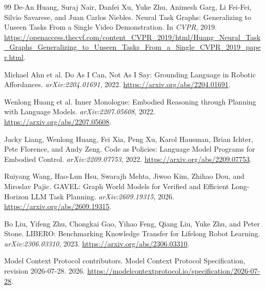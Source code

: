 \documentclass[10pt,twocolumn,letterpaper]{article}
\begin{document}
\begin{thebibliography}{99}
De-An Huang, Suraj Nair, Danfei Xu, Yuke Zhu, Animesh Garg, Li Fei-Fei, Silvio Savarese, and Juan Carlos Niebles.
Neural Task Graphs: Generalizing to Unseen Tasks From a Single Video Demonstration.
In \emph{CVPR}, 2019.
\url{https://openaccess.thecvf.com/content_CVPR_2019/html/Huang_Neural_Task_Graphs_Generalizing_to_Unseen_Tasks_From_a_Single_CVPR_2019_paper.html}.

Michael Ahn et al.
Do As I Can, Not As I Say: Grounding Language in Robotic Affordances.
\emph{arXiv:2204.01691}, 2022.
\url{https://arxiv.org/abs/2204.01691}.

Wenlong Huang et al.
Inner Monologue: Embodied Reasoning through Planning with Language Models.
\emph{arXiv:2207.05608}, 2022.
\url{https://arxiv.org/abs/2207.05608}.

Jacky Liang, Wenlong Huang, Fei Xia, Peng Xu, Karol Hausman, Brian Ichter, Pete Florence, and Andy Zeng.
Code as Policies: Language Model Programs for Embodied Control.
\emph{arXiv:2209.07753}, 2022.
\url{https://arxiv.org/abs/2209.07753}.

Ruiyang Wang, Hao-Lun Hsu, Swarajh Mehta, Jiwoo Kim, Zhihao Dou, and Miroslav Pajic.
GAVEL: Graph World Models for Verified and Efficient Long-Horizon LLM Task Planning.
\emph{arXiv:2609.19315}, 2026.
\url{https://arxiv.org/abs/2609.19315}.

Bo Liu, Yifeng Zhu, Chongkai Gao, Yihao Feng, Qiang Liu, Yuke Zhu, and Peter Stone.
LIBERO: Benchmarking Knowledge Transfer for Lifelong Robot Learning.
\emph{arXiv:2306.03310}, 2023.
\url{https://arxiv.org/abs/2306.03310}.

Model Context Protocol contributors.
Model Context Protocol Specification, revision 2026-07-28.
2026.
\url{https://modelcontextprotocol.io/specification/2026-07-28}.

\end{thebibliography}

\end{document}
